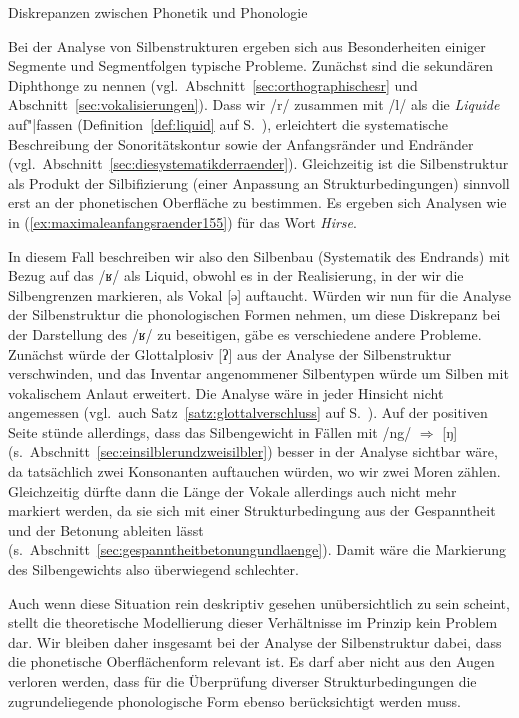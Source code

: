\begin{Vertiefung}{Diskrepanzen zwischen Phonetik und Phonologie}


\noindent Bei der Analyse von Silbenstrukturen ergeben sich aus Besonderheiten einiger Segmente und Segmentfolgen typische Probleme.
Zunächst sind die sekundären Diphthonge zu nennen (vgl.\ Abschnitt~\ref{sec:orthographischesr} und Abschnitt~\ref{sec:vokalisierungen}).
Dass wir /r/ zusammen mit /l/ als die \textit{Liquide} auf"|fassen (Definition~\ref{def:liquid} auf S.\ \pageref{def:liquid}), erleichtert die systematische Beschreibung der Sonoritätskontur sowie der Anfangsränder und Endränder (vgl.\ Abschnitt~\ref{sec:diesystematikderraender}).
Gleichzeitig ist die Silbenstruktur als Produkt der Silbifizierung (einer Anpassung an Strukturbedingungen) sinnvoll erst an der phonetischen Oberfläche zu bestimmen.
Es ergeben sich Analysen wie in (\ref{ex:maximaleanfangsraender155}) für das Wort \textit{Hirse}.

\begin{exe}
\end{exe}

In diesem Fall beschreiben wir also den Silbenbau (Systematik des Endrands) mit Bezug auf das /ʁ/ als Liquid, obwohl es in der Realisierung, in der wir die Silbengrenzen markieren, als Vokal [ə] auftaucht.
Würden wir nun für die Analyse der Silbenstruktur die phonologischen Formen nehmen, um diese Diskrepanz bei der Darstellung des /ʁ/ zu beseitigen, gäbe es verschiedene andere Probleme.
Zunächst würde der Glottalplosiv [ʔ] aus der Analyse der Silbenstruktur verschwinden, und das Inventar angenommener Silbentypen würde um Silben mit vokalischem Anlaut erweitert.
Die Analyse wäre in jeder Hinsicht nicht angemessen (vgl.\ auch Satz~\ref{satz:glottalverschluss} auf S.\ \pageref{satz:glottalverschluss}).
Auf der positiven Seite stünde allerdings, dass das Silbengewicht in Fällen mit /ng/ $\Rightarrow$ [ŋ] (s.\ Abschnitt~\ref{sec:einsilblerundzweisilbler}) besser in der Analyse sichtbar wäre, da tatsächlich zwei Konsonanten auftauchen würden, wo wir zwei Moren zählen.
Gleichzeitig dürfte dann die Länge der Vokale allerdings auch nicht mehr markiert werden, da sie sich mit einer Strukturbedingung aus der Gespanntheit und der Betonung ableiten lässt (s.\ Abschnitt~\ref{sec:gespanntheitbetonungundlaenge}).
Damit wäre die Markierung des Silbengewichts also überwiegend schlechter.

Auch wenn diese Situation rein deskriptiv gesehen unübersichtlich zu sein scheint, stellt die theoretische Modellierung dieser Verhältnisse im Prinzip kein Problem dar.
Wir bleiben daher insgesamt bei der Analyse der Silbenstruktur dabei, dass die phonetische Oberflächenform relevant ist.
Es darf aber nicht aus den Augen verloren werden, dass für die Überprüfung diverser Strukturbedingungen die zugrundeliegende phonologische Form ebenso berücksichtigt werden muss.

\end{Vertiefung}

